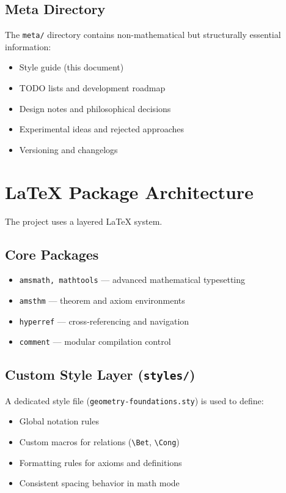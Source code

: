 \documentclass{book}
\begin{document}
\subsection{Meta Directory}

The \texttt{meta/} directory contains non-mathematical but structurally essential information:

\begin{itemize}
    \item Style guide (this document)
    \item TODO lists and development roadmap
    \item Design notes and philosophical decisions
    \item Experimental ideas and rejected approaches
    \item Versioning and changelogs
\end{itemize}

\section{LaTeX Package Architecture}

The project uses a layered LaTeX system.

\subsection{Core Packages}

\begin{itemize}
    \item \texttt{amsmath, mathtools} — advanced mathematical typesetting
    \item \texttt{amsthm} — theorem and axiom environments
    \item \texttt{hyperref} — cross-referencing and navigation
    \item \texttt{comment} — modular compilation control
\end{itemize}

\subsection{Custom Style Layer (\texttt{styles/})}

A dedicated style file (\texttt{geometry-foundations.sty}) is used to define:

\begin{itemize}
    \item Global notation rules
    \item Custom macros for relations (\texttt{\textbackslash Bet}, \texttt{\textbackslash Cong})
    \item Formatting rules for axioms and definitions
    \item Consistent spacing behavior in math mode
\end{itemize}
\end{document}
